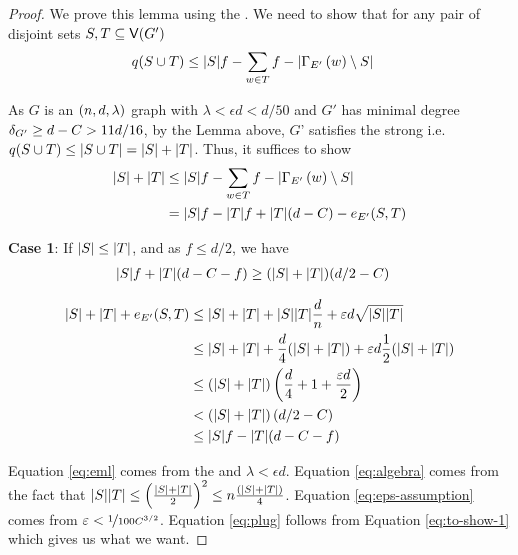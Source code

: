 \documentclass[11pt]{article}
\begin{document}
\begin{proof}
  We prove this lemma using the .
  We need to show that for any pair of disjoint sets $S, T \subseteq \Vertices{G'}$
  \begin{align}
\OddComponents{S \cup T} &\le \Size{S}f - \sum_{w \in T} f - \Size{\Neighbourhood{E'}{w} \setminus S}
  \end{align}

As $G$ is an $\EnDeeLambda$ graph with $\lambda < \epsilon d < d/50$ and $G'$ has minimal degree $\MinimalDegree{G'} \ge d - C >  11d/16$, by the Lemma above, $G$' satisfies the strong  i.e. $\OddComponents{S \cup T} \le \Size{S \cup T} = |S| + |T|$.
  Thus, it suffices to show
  \begin{align}
    |S| + |T| &\le |S|f - \sum_{w \in T} f - \Size{\Neighbourhood{E'}{w} \setminus S}   \\
              &=\Size{S}f - \Size{T}f + \Size{T}(d-C) - \CutEdges{S}{T}{E'}  \label{eq:to-show}
  \end{align}  

  \textbf{Case 1}: If $\Size{S} \leq \Size{T}$, and as $f \leq d/2$, we have 
  \begin{align}
    \Size{S}f + \Size{T}(d-C-f)  &\ge (\Size{S} + \Size{T})(d/2 -C) \label{eq:to-show-1}
  \end{align}

\begin{align}
  |S| + |T| + \CutEdges{S}{T}{E'} &\le  |S| + |T| + |S||T|\frac{d}{n} + \epsilon d \sqrt{\Size{S}\Size{T}} \label{eq:eml}\\
                                 &\le |S| + |T| + \frac{d}{4}(\Size{S} + \Size{T}) + \epsilon d \frac{1}{2}(\Size{S} + \Size{T}) \label{eq:algebra}\\
                                 &\le (\Size{S} + \Size{T})\left(\frac{d}{4} + 1 + \frac{
                                   \epsilon d}{2}\right) \\
                                 &<  (\Size{S} + \Size{T})\left(d/2-C\right) \label{eq:eps-assumption}\\
                                 &\le \Size{S}f - \Size{T}(d-C-f) \label{eq:plug}
 \end{align}  
  
Equation \eqref{eq:eml} comes from the  and $\lambda < \epsilon d$.
Equation \eqref{eq:algebra} comes from the fact that $\Size{S}\Size{T} \leq \left(\frac{\Size{S}+\Size{T}}{2}\right)^2 \le n\frac{(\Size{S}+\Size{T})}{4}$.
Equation \eqref{eq:eps-assumption} comes from $\epsilon < \nicefrac{1}{100C^{3/2}}$.
Equation \eqref{eq:plug} follows from Equation \eqref{eq:to-show-1} which gives us what we want.


\end{proof}
\end{document}
